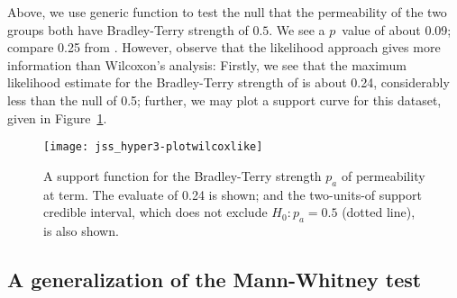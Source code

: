 \documentclass[article]{jss}
\begin{document}
%
Above, we use generic function  to test the null
that the permeability of the two groups both have Bradley-Terry
strength of $0.5$.  We see a $p$~value of about 0.09; compare 0.25 from
.  However, observe that the 
likelihood approach gives more information than Wilcoxon's analysis:
Firstly, we see that the maximum likelihood estimate for the
Bradley-Terry strength of  is about 0.24, considerably less
than the null of 0.5; further, we may plot a support curve for this
dataset, given in Figure~\ref{wilcox_likelihood}.

\begin{figure}[t!]
\centering
\texttt{[image: jss\_hyper3-plotwilcoxlike]}
\caption{A\label{wilcox_likelihood} support function for the Bradley-Terry
strength $p_a$ of permeability at term.  The evaluate of 0.24 is
shown; and the two-units-of support credible interval, which does not
exclude $H_0\colon p_a=0.5$ (dotted line), is also shown.}
\end{figure}

\subsection{A generalization of the Mann-Whitney test}
\end{document}
